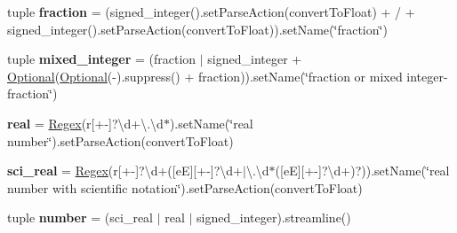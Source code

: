 \begin{DoxyCompactItemize}
tuple {\bfseries fraction} = (signed\+\_\+integer().set\+Parse\+Action(convert\+To\+Float) + \textquotesingle{}/\textquotesingle{} + signed\+\_\+integer().set\+Parse\+Action(convert\+To\+Float)).set\+Name(\char`\"{}fraction\char`\"{})
\item 
\mbox{\label{classsetuptools_1_1__vendor_1_1pyparsing_1_1pyparsing__common_a51967c966e901c0ce1896350c51b4c3f}} 
tuple {\bfseries mixed\+\_\+integer} = (fraction $\vert$ signed\+\_\+integer + \hyperlink{classsetuptools_1_1__vendor_1_1pyparsing_1_1_optional}{Optional}(\hyperlink{classsetuptools_1_1__vendor_1_1pyparsing_1_1_optional}{Optional}(\textquotesingle{}-\/\textquotesingle{}).suppress() + fraction)).set\+Name(\char`\"{}fraction or mixed integer-\/fraction\char`\"{})
\item 
\mbox{\label{classsetuptools_1_1__vendor_1_1pyparsing_1_1pyparsing__common_a016ebb825bd742597b38d9dbb5720ddf}} 
{\bfseries real} = \hyperlink{classsetuptools_1_1__vendor_1_1pyparsing_1_1_regex}{Regex}(r\textquotesingle{}\mbox{[}+-\/\mbox{]}?\textbackslash{}d+\textbackslash{}.\textbackslash{}d$\ast$\textquotesingle{}).set\+Name(\char`\"{}real number\char`\"{}).set\+Parse\+Action(convert\+To\+Float)
\item 
\mbox{\label{classsetuptools_1_1__vendor_1_1pyparsing_1_1pyparsing__common_a800b348e32ebbdd87cda9394ffed8a2e}} 
{\bfseries sci\+\_\+real} = \hyperlink{classsetuptools_1_1__vendor_1_1pyparsing_1_1_regex}{Regex}(r\textquotesingle{}\mbox{[}+-\/\mbox{]}?\textbackslash{}d+(\mbox{[}eE\mbox{]}\mbox{[}+-\/\mbox{]}?\textbackslash{}d+$\vert$\textbackslash{}.\textbackslash{}d$\ast$(\mbox{[}eE\mbox{]}\mbox{[}+-\/\mbox{]}?\textbackslash{}d+)?)\textquotesingle{}).set\+Name(\char`\"{}real number with scientific notation\char`\"{}).set\+Parse\+Action(convert\+To\+Float)
\item 
\mbox{\label{classsetuptools_1_1__vendor_1_1pyparsing_1_1pyparsing__common_a97c174431ad66ffe4766a4bf70eb9c64}} 
tuple {\bfseries number} = (sci\+\_\+real $\vert$ real $\vert$ signed\+\_\+integer).streamline()
\item 
\mbox{\label{classsetuptools_1_1__vendor_1_1pyparsing_1_1pyparsing__common_acebb5421cc1724451c7fea286b51d54d}} 

\end{DoxyCompactItemize}
